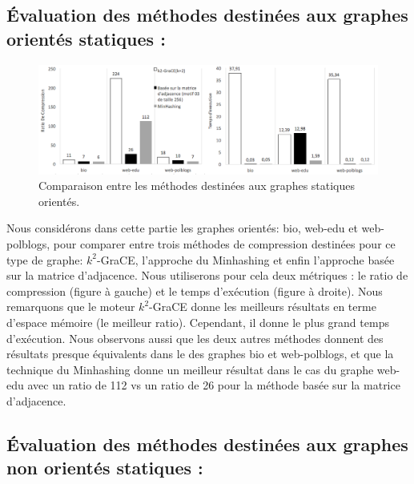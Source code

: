 	\subsection{Évaluation des méthodes destinées aux graphes orientés statiques :}
\begin{figure}[H]
		\begin{center}
		 \includegraphics[scale=0.4]{ressources/image/compNon.png}
			
			
			\caption{Comparaison entre les méthodes destinées aux graphes statiques orientés.}
			\label{fig:comp-dyn}
		\end{center}
	\end{figure}	
	
	Nous considérons dans cette partie les graphes orientés: bio, web-edu et web-polblogs, pour comparer entre trois méthodes de compression destinées pour ce type de graphe: $k^2$-GraCE, l'approche du Minhashing et enfin l'approche basée sur la matrice d'adjacence. Nous utiliserons pour cela deux métriques : le ratio de compression (figure à gauche) et le temps d'exécution (figure à droite). Nous remarquons que le moteur $k^2$-GraCE donne les meilleurs résultats en terme d'espace mémoire (le meilleur ratio). Cependant, il donne le plus grand temps d'exécution. Nous observons aussi que les deux autres méthodes donnent des résultats presque équivalents dans le des graphes bio et web-polblogs, et que la technique du Minhashing donne un meilleur résultat dans le cas du graphe web-edu avec un ratio de 112 vs un ratio de 26 pour la méthode basée sur la matrice d'adjacence. 
	
	\subsection{Évaluation des méthodes destinées aux graphes non orientés statiques :}
	
